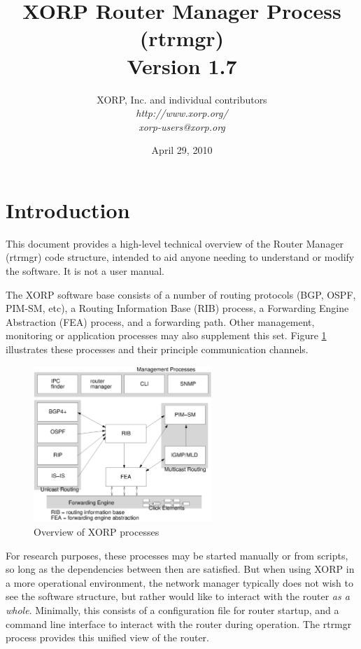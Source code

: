 \documentclass[11pt]{article}
\begin{document}
\title{XORP Router Manager Process (rtrmgr) \\
\vspace{1ex}
Version 1.7}
\author{ XORP, Inc. and individual contributors		\\
         {\it http://www.xorp.org/}			\\
	 {\it xorp-users@xorp.org}
}
\date{April 29, 2010}

\maketitle


\section{Introduction}

This document provides a high-level technical overview of the Router
Manager (rtrmgr) code structure, intended to aid anyone needing to
understand or modify the software.   It is not a user manual.

The XORP software base consists of a number of routing protocols (BGP,
OSPF, PIM-SM, etc), a Routing Information Base (RIB) process, a
Forwarding Engine Abstraction (FEA) process, and a forwarding path.
Other management, monitoring or application processes may also
supplement this set.  Figure \ref{overview} illustrates these
processes and their principle communication channels.

\begin{figure}[htb]
\centerline{\includegraphics[width=0.6\textwidth]{figs/processes3}}
\vspace{.05in}
\caption{\label{overview}Overview of XORP processes}
\end{figure}

For research purposes, these processes may be started manually or from
scripts, so long as the dependencies between then are satisfied.  But
when using XORP in a more operational environment, the network manager
typically does not wish to see the software structure, but rather
would like to interact with the router {\it as a whole}.  Minimally, this
consists of a configuration file for router startup, and a command
line interface to interact with the router during operation.  The
rtrmgr process provides this unified view of the router.
\end{document}
